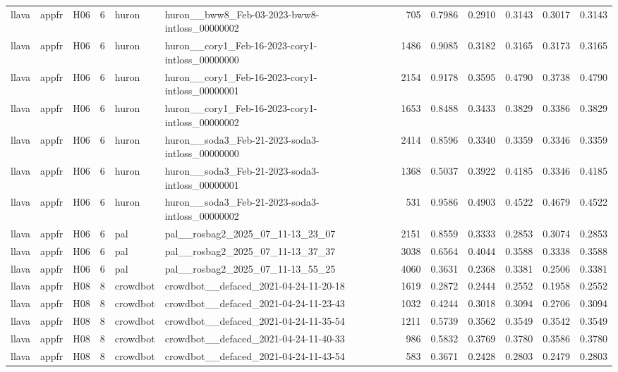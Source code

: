 \begin{table}[tbp]
\begin{tabular}{lllrllrrrrrr}
llava & appfr & H06 & 6 & huron & huron\_\_bww8\_Feb-03-2023-bww8-intloss\_00000002 & 705 & 0.7986 & 0.2910 & 0.3143 & 0.3017 & 0.3143 \\
llava & appfr & H06 & 6 & huron & huron\_\_cory1\_Feb-16-2023-cory1-intloss\_00000000 & 1486 & 0.9085 & 0.3182 & 0.3165 & 0.3173 & 0.3165 \\
llava & appfr & H06 & 6 & huron & huron\_\_cory1\_Feb-16-2023-cory1-intloss\_00000001 & 2154 & 0.9178 & 0.3595 & 0.4790 & 0.3738 & 0.4790 \\
llava & appfr & H06 & 6 & huron & huron\_\_cory1\_Feb-16-2023-cory1-intloss\_00000002 & 1653 & 0.8488 & 0.3433 & 0.3829 & 0.3386 & 0.3829 \\
llava & appfr & H06 & 6 & huron & huron\_\_soda3\_Feb-21-2023-soda3-intloss\_00000000 & 2414 & 0.8596 & 0.3340 & 0.3359 & 0.3346 & 0.3359 \\
llava & appfr & H06 & 6 & huron & huron\_\_soda3\_Feb-21-2023-soda3-intloss\_00000001 & 1368 & 0.5037 & 0.3922 & 0.4185 & 0.3346 & 0.4185 \\
llava & appfr & H06 & 6 & huron & huron\_\_soda3\_Feb-21-2023-soda3-intloss\_00000002 & 531 & 0.9586 & 0.4903 & 0.4522 & 0.4679 & 0.4522 \\
llava & appfr & H06 & 6 & pal & pal\_\_rosbag2\_2025\_07\_11-13\_23\_07 & 2151 & 0.8559 & 0.3333 & 0.2853 & 0.3074 & 0.2853 \\
llava & appfr & H06 & 6 & pal & pal\_\_rosbag2\_2025\_07\_11-13\_37\_37 & 3038 & 0.6564 & 0.4044 & 0.3588 & 0.3338 & 0.3588 \\
llava & appfr & H06 & 6 & pal & pal\_\_rosbag2\_2025\_07\_11-13\_55\_25 & 4060 & 0.3631 & 0.2368 & 0.3381 & 0.2506 & 0.3381 \\
llava & appfr & H08 & 8 & crowdbot & crowdbot\_\_defaced\_2021-04-24-11-20-18 & 1619 & 0.2872 & 0.2444 & 0.2552 & 0.1958 & 0.2552 \\
llava & appfr & H08 & 8 & crowdbot & crowdbot\_\_defaced\_2021-04-24-11-23-43 & 1032 & 0.4244 & 0.3018 & 0.3094 & 0.2706 & 0.3094 \\
llava & appfr & H08 & 8 & crowdbot & crowdbot\_\_defaced\_2021-04-24-11-35-54 & 1211 & 0.5739 & 0.3562 & 0.3549 & 0.3542 & 0.3549 \\
llava & appfr & H08 & 8 & crowdbot & crowdbot\_\_defaced\_2021-04-24-11-40-33 & 986 & 0.5832 & 0.3769 & 0.3780 & 0.3586 & 0.3780 \\
llava & appfr & H08 & 8 & crowdbot & crowdbot\_\_defaced\_2021-04-24-11-43-54 & 583 & 0.3671 & 0.2428 & 0.2803 & 0.2479 & 0.2803 \\

\end{tabular}
\end{table}
